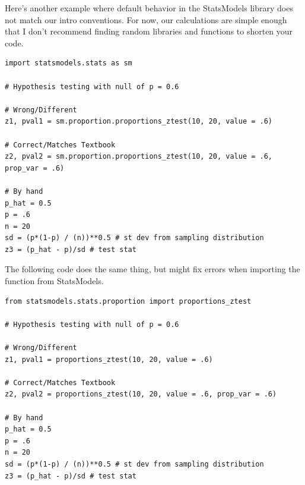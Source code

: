 \documentclass{article}
\begin{document}
Here's another example where default behavior in the StatsModels library does not match our intro conventions. For now, our calculations are simple enough that I don't recommend finding random libraries and functions to shorten your code. 

\begin{lstlisting}
import statsmodels.stats as sm

# Hypothesis testing with null of p = 0.6

# Wrong/Different
z1, pval1 = sm.proportion.proportions_ztest(10, 20, value = .6)

# Correct/Matches Textbook
z2, pval2 = sm.proportion.proportions_ztest(10, 20, value = .6, prop_var = .6)

# By hand
p_hat = 0.5
p = .6
n = 20
sd = (p*(1-p) / (n))**0.5 # st dev from sampling distribution
z3 = (p_hat - p)/sd # test stat
\end{lstlisting}

\noindent The following code does the same thing, but might fix errors when importing the function from StatsModels. 

\begin{lstlisting}
from statsmodels.stats.proportion import proportions_ztest

# Hypothesis testing with null of p = 0.6

# Wrong/Different
z1, pval1 = proportions_ztest(10, 20, value = .6)

# Correct/Matches Textbook
z2, pval2 = proportions_ztest(10, 20, value = .6, prop_var = .6)

# By hand
p_hat = 0.5
p = .6
n = 20
sd = (p*(1-p) / (n))**0.5 # st dev from sampling distribution
z3 = (p_hat - p)/sd # test stat
\end{lstlisting}
\end{document}
